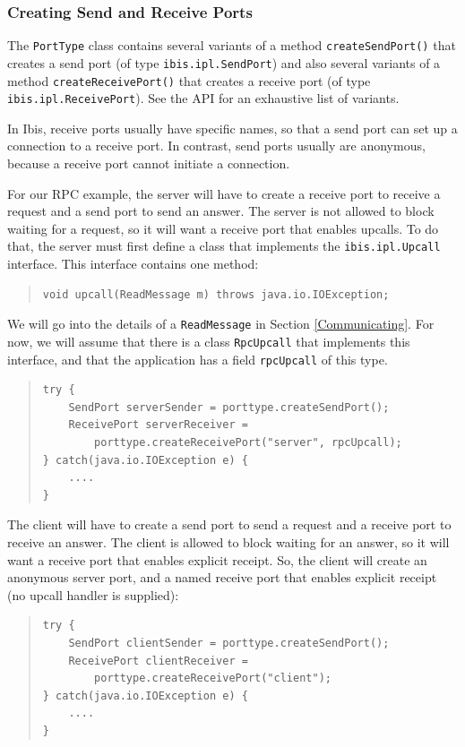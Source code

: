 \documentclass[10pt]{article}
\begin{document}
\subsubsection{Creating Send and Receive Ports}

The \texttt{PortType} class contains several variants of a method
\texttt{createSendPort()} that creates a send port (of type
\texttt{ibis.ipl.SendPort}) and
also several variants of a method \texttt{createReceivePort()} that
creates a receive port (of type \texttt{ibis.ipl.ReceivePort}).
See the API for an exhaustive list of variants.

In Ibis, receive ports usually have specific names, so that
a send port can set up a connection to a receive port. In contrast,
send ports usually are anonymous, because a receive port cannot
initiate a connection.

For our RPC example, the server will have to create a receive port
to receive a request and a send port to send an answer.
The server is not allowed to block waiting for a request, so it will
want a receive port that enables upcalls.
To do that, the server must first define a class that implements
the \texttt{ibis.ipl.Upcall} interface. This interface contains one
method:

\begin{quote}
\begin{verbatim}
void upcall(ReadMessage m) throws java.io.IOException;
\end{verbatim}
\end{quote}

We will go into the details of a \texttt{ReadMessage} in Section
\ref{Communicating}. For now, we will assume that there is a
class \texttt{RpcUpcall} that implements this interface, and
that the application has a field \texttt{rpcUpcall} of this type.

\begin{quote}
\begin{verbatim}
try {
    SendPort serverSender = porttype.createSendPort();
    ReceivePort serverReceiver =
        porttype.createReceivePort("server", rpcUpcall);
} catch(java.io.IOException e) {
    ....
}
\end{verbatim}
\end{quote}

\noindent
The client will have to create a send port
to send a request and a receive port to receive an answer.
The client is allowed to block waiting for an answer, so it will
want a receive port that enables explicit receipt.
So, the client will create an anonymous server port, and a named
receive port that enables explicit receipt (no upcall handler is supplied):
\begin{quote}
\begin{verbatim}
try {
    SendPort clientSender = porttype.createSendPort();
    ReceivePort clientReceiver =
        porttype.createReceivePort("client");
} catch(java.io.IOException e) {
    ....
}
\end{verbatim}
\end{quote}
\end{document}
